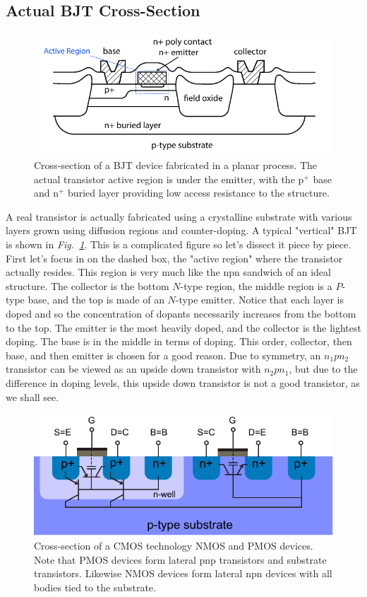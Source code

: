 \subsection{Actual BJT Cross-Section}
\begin{figure}[tb]
\centering
\includegraphics[width=.75\columnwidth]{slide3_bjtcross}
\caption{Cross-section of a BJT device fabricated in a planar process.  The actual transistor active region is under the emitter, with the p$^+$ base and n$^+$ buried layer providing low access resistance to the structure.}
\label{fig:slide3_bjtcross}
\end{figure}
A real transistor is actually fabricated using a crystalline substrate with various layers grown using diffusion regions and counter-doping.  A typical "vertical" BJT is shown in \emph{Fig.~\ref{fig:slide3_bjtcross}}.  This is a complicated figure so let's dissect it piece by piece.   First let's focus in on the dashed box, the "active region" where the transistor actually resides.  This region is very much like the npn sandwich of an ideal structure.  The collector is the bottom $N$-type region, the middle region is a $P$-type base, and the top is made of an $N$-type emitter.  Notice that each layer is doped and so the concentration of dopants necessarily increases from the bottom to the top. The emitter is the most heavily doped, and the collector is the lightest doping. The base is in the middle in terms of doping.  This order, collector, then base, and then emitter is chosen for a good reason.  Due to symmetry, an $n_1 p n_2$ transistor can be viewed as an upside down transistor with $n_2 p n_1$, but due to the difference in doping levels, this upside down transistor is not a good transistor, as we shall see.  
\begin{figure}[tb]
\centering
\includegraphics[width=.75\columnwidth]{mos_bjt}
\caption{Cross-section of a CMOS technology NMOS and PMOS devices.  Note that PMOS devices form lateral pnp transistors and substrate transistors.  Likewise NMOS devices form lateral npn devices with all bodies tied to the substrate.}
\label{fig:mos_bjt}
\end{figure}
